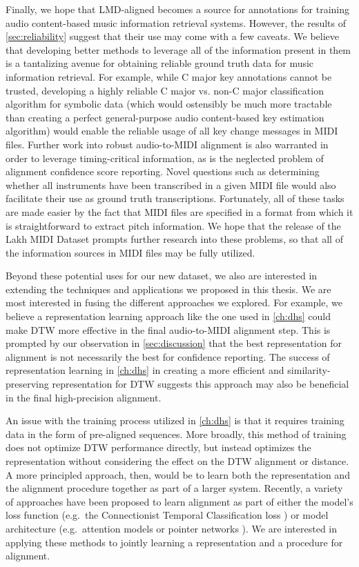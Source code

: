 Finally, we hope that LMD-aligned becomes a source for annotations for training audio content-based music information retrieval systems.
However, the results of \cref{sec:reliability} suggest that their use may come with a few caveats.
We believe that developing better methods to leverage all of the information present in them is a tantalizing avenue for obtaining reliable ground truth data for music information retrieval.
For example, while C major key annotations cannot be trusted, developing a highly reliable C major vs. non-C major classification algorithm for symbolic data (which would ostensibly be much more tractable than creating a perfect general-purpose audio content-based key estimation algorithm) would enable the reliable usage of all key change messages in MIDI files.
Further work into robust audio-to-MIDI alignment is also warranted in order to leverage timing-critical information, as is the neglected problem of alignment confidence score reporting.
Novel questions such as determining whether all instruments have been transcribed in a given MIDI file would also facilitate their use as ground truth transcriptions.
Fortunately, all of these tasks are made easier by the fact that MIDI files are specified in a format from which it is straightforward to extract pitch information.
We hope that the release of the Lakh MIDI Dataset prompts further research into these problems, so that all of the information sources in MIDI files may be fully utilized.

Beyond these potential uses for our new dataset, we also are interested in extending the techniques and applications we proposed in this thesis.
We are most interested in fusing the different approaches we explored.
For example, we believe a representation learning approach like the one used in \cref{ch:dhs} could make DTW more effective in the final audio-to-MIDI alignment step.
This is prompted by our observation in \cref{sec:discussion} that the best representation for alignment is not necessarily the best for confidence reporting.
The success of representation learning in \cref{ch:dhs} in creating a more efficient and similarity-preserving representation for DTW suggests this approach may also be beneficial in the final high-precision alignment.

An issue with the training process utilized in \cref{ch:dhs} is that it requires training data in the form of pre-aligned sequences.
More broadly, this method of training does not optimize DTW performance directly, but instead optimizes the representation without considering the effect on the DTW alignment or distance.
A more principled approach, then, would be to learn both the representation and the alignment procedure together as part of a larger system.
Recently, a variety of approaches have been proposed to learn alignment as part of either the model's loss function (e.g.\ the Connectionist Temporal Classification loss \cite{graves2006connectionist}) or model architecture (e.g.\ attention models \cite{bahdanau2014neural} or pointer networks \cite{vinyals2015pointer}).
We are interested in applying these methods to jointly learning a representation and a procedure for alignment.

